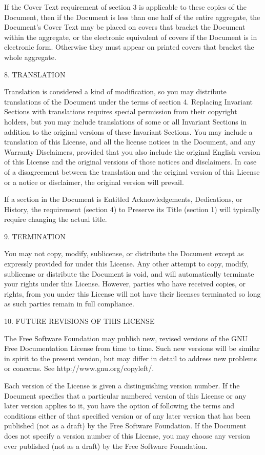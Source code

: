 \begin{noIndex}
If the Cover Text requirement of section 3 is applicable to these
copies of the Document, then if the Document is less than one half of
the entire aggregate, the Document's Cover Text may be placed on
covers that bracket the Document within the aggregate, or the
electronic equivalent of covers if the Document is in electronic
form. Otherwise they must appear on printed covers that bracket the
whole aggregate.


8. TRANSLATION 

Translation is considered a kind of modification, so you may
distribute translations of the Document under the terms of section
4. Replacing Invariant Sections with translations requires special
permission from their copyright holders, but you may include
translations of some or all Invariant Sections in addition to the
original versions of these Invariant Sections. You may include a
translation of this License, and all the license notices in the
Document, and any Warranty Disclaimers, provided that you also include
the original English version of this License and the original versions
of those notices and disclaimers. In case of a disagreement between
the translation and the original version of this License or a notice
or disclaimer, the original version will prevail.

If a section in the Document is Entitled
{\textquotedbl}Acknowledgements{\textquotedbl},
{\textquotedbl}Dedications{\textquotedbl}, or
{\textquotedbl}History{\textquotedbl}, the requirement (section 4) to
Preserve its Title (section 1) will typically require changing the
actual title.


9. TERMINATION 

You may not copy, modify, sublicense, or distribute the Document
except as expressly provided for under this License.  Any other
attempt to copy, modify, sublicense or distribute the Document is
void, and will automatically terminate your rights under this
License. However, parties who have received copies, or rights, from
you under this License will not have their licenses terminated so long
as such parties remain in full compliance.


10. FUTURE REVISIONS OF THIS LICENSE 

The Free Software Foundation may publish new, revised versions of the
GNU Free Documentation License from time to time.  Such new versions
will be similar in spirit to the present version, but may differ in
detail to address new problems or concerns. See
http://www.gnu.org/copyleft/.

Each version of the License is given a distinguishing version
number. If the Document specifies that a particular numbered version
of this License {\textquotedbl}or any later version{\textquotedbl}
applies to it, you have the option of following the terms and
conditions either of that specified version or of any later version
that has been published (not as a draft) by the Free Software
Foundation. If the Document does not specify a version number of this
License, you may choose any version ever published (not as a draft) by
the Free Software Foundation.
\end{noIndex}
